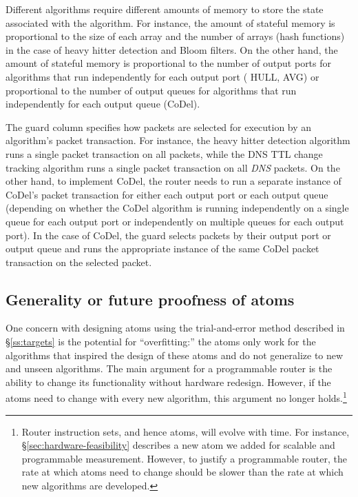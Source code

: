 Different algorithms require different amounts of memory to store the state
associated with the algorithm. For instance, the amount of stateful memory is
proportional to the size of each array and the number of arrays (hash
functions) in the case of heavy hitter detection and Bloom filters. On the
other hand, the amount of stateful memory is proportional to the number of
output ports for algorithms that run independently for each output port (\eg
HULL, AVG) or proportional to the number of output queues for algorithms that
run independently for each output queue (\eg CoDel).

The guard column specifies how packets are selected for execution by an
algorithm's packet transaction. For instance, the heavy hitter detection
algorithm runs a single packet transaction on all packets, while the DNS TTL
change tracking algorithm runs a single packet transaction on all {\em DNS}
packets. On the other hand, to implement CoDel, the router needs to run a
separate instance of CoDel's packet transaction for either each output port or
each output queue (depending on whether the CoDel algorithm is running
independently on a single queue for each output port or independently on
multiple queues for each output port). In the case of CoDel, the guard selects
packets by their output port or output queue and runs the appropriate instance
of the same CoDel packet transaction on the selected packet.

\subsection{Generality or future proofness of atoms}
One concern with designing atoms using the trial-and-error method described in
\S\ref{ss:targets} is the potential for ``overfitting:'' the atoms only
work for the algorithms that inspired the design of these atoms and do not
generalize to new and unseen algorithms. The main argument for a programmable
router is the ability to change its functionality without hardware redesign.
However, if the atoms need to change with every new algorithm, this argument no
longer holds.\footnote{Router instruction sets, and hence atoms, will evolve
with time. For instance, \S\ref{sec:hardware-feasibility} describes a new atom
we added for scalable and programmable measurement. However, to justify a
programmable router, the rate at which atoms need to change should be slower
than the rate at which new algorithms are developed.}



